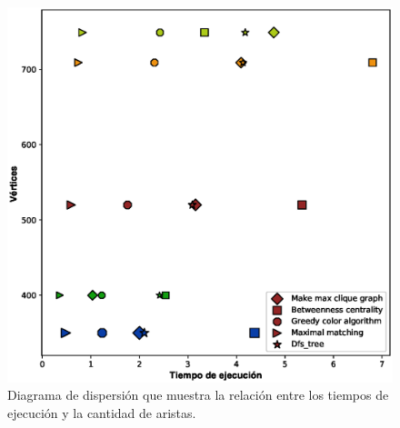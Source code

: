 \documentclass{article}
\begin{document}
\begin{figure}[h]
\includegraphics[scale=0.6]{DiagramVertices.eps}
\caption{Diagrama de dispersión que muestra la relación entre los tiempos de ejecución y la cantidad de aristas.}
\end{figure}
 
\newpage

\newpage


\end{document}
